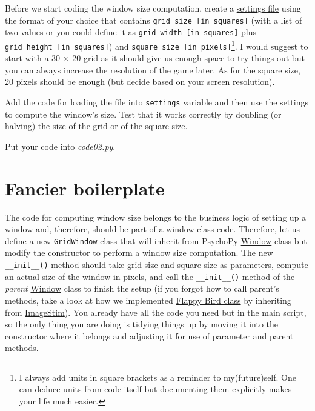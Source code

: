 \documentclass[
]{book}
\begin{document}
Before we start coding the window size computation, create a \protect\hyperlink{settings-files}{settings file} using the format of your choice that contains \texttt{grid\ size\ {[}in\ squares{]}} (with a list of two values or you could define it as \texttt{grid\ width\ {[}in\ squares{]}} plus \texttt{grid\ height\ {[}in\ squares{]}}) and \texttt{square\ size\ {[}in\ pixels{]}}\footnote{I always add units in square brackets as a reminder to my(future)self. One can deduce units from code itself but documenting them explicitly makes your life much easier.}. I would suggest to start with a 30 × 20 grid as it should give us enough space to try things out but you can always increase the resolution of the game later. As for the square size, 20 pixels should be enough (but decide based on your screen resolution).

Add the code for loading the file into \texttt{settings} variable and then use the settings to compute the window's size. Test that it works correctly by doubling (or halving) the size of the grid or of the square size.

Put your code into \emph{code02.py}.

\hypertarget{fancier-boilerplate}{%
\section{Fancier boilerplate}\label{fancier-boilerplate}}

The code for computing window size belongs to the business logic of setting up a window and, therefore, should be part of a window class code. Therefore, let us define a new \texttt{GridWindow} class that will inherit from PsychoPy \href{https://psychopy.org/api/visual/window.html\#psychopy.visual.Window}{Window} class but modify the constructor to perform a window size computation. The new \texttt{\_\_init\_\_()} method should take grid size and square size as parameters, compute an actual size of the window in pixels, and call the \texttt{\_\_init\_\_()} method of the \emph{parent} \href{https://psychopy.org/api/visual/window.html\#psychopy.visual.Window}{Window} class to finish the setup (if you forgot how to call parent's methods, take a look at how we implemented \protect\hyperlink{flappy-bird-class}{Flappy Bird class} by inheriting from \href{https://psychopy.org/api/visual/imagestim.html\#psychopy.visual.ImageStim}{ImageStim}). You already have all the code you need but in the main script, so the only thing you are doing is tidying things up by moving it into the constructor where it belongs and adjusting it for use of parameter and parent methods.
\end{document}
